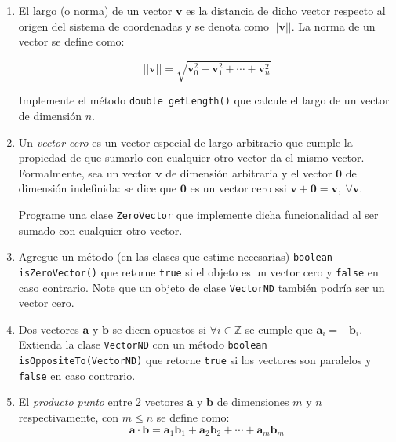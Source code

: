   \begin{Exercise}[title={Algebra vectorial}]
    \begin{enumerate}
      \item El largo (o norma) de un vector \(\mathbf{v}\) es la distancia de dicho vector 
        respecto al origen del sistema de coordenadas y se denota como \(||\mathbf{v}||\).
        La norma de un vector se define como:

        \[  
          ||\mathbf{v}|| = 
            \sqrt{\mathbf{v}_0^2 + \mathbf{v}_1^2 + \cdots + \mathbf{v}_n^2 }
        \]

        Implemente el método \texttt{double getLength()} que calcule el largo de
        un vector de dimensión \(n\). 

      \item Un \textit{vector cero} es un vector especial de largo arbitrario que cumple 
        la propiedad de que sumarlo con cualquier otro vector da el mismo vector.
        Formalmente, sea un vector \(\mathbf{v}\) de dimensión arbitraria y el vector 
        \(\mathbf{0}\) de dimensión indefinida: se dice que \(\mathbf{0}\) es un vector 
        cero ssi \(\mathbf{v} + \mathbf{0} = \mathbf{v},\ \forall \mathbf{v}\).

        Programe una clase \texttt{ZeroVector} que implemente dicha funcionalidad al ser 
        sumado con cualquier otro vector.
      
      \item Agregue un método (en las clases que estime necesarias) 
        \texttt{boolean isZeroVector()} que retorne \texttt{true} si
        el objeto es un vector cero y \texttt{false} en caso contrario.
        Note que un objeto de clase \texttt{VectorND} también podría ser un vector cero.

      \item Dos vectores \(\mathbf{a}\) y \(\mathbf{b}\) se dicen opuestos si 
        \(\forall i \in \mathbb{Z}\) 
        se cumple que \(\mathbf{a}_i = -\mathbf{b}_i\).
        Extienda la clase \texttt{VectorND} con un método 
        \texttt{boolean isOppositeTo(VectorND)} que retorne 
        \texttt{true} si los vectores son paralelos y \texttt{false} 
        en caso contrario.
      
      \item El \textit{producto punto} entre 2 vectores \(\mathbf{a}\) y \(\mathbf{b}\) de 
        dimensiones \(m\) y \(n\) respectivamente, con \(m \leq n\) se define como:
        \[
          \mathbf{a} \cdot \mathbf{b} = \mathbf{a}_1 \mathbf{b}_1 
            + \mathbf{a}_2 \mathbf{b}_2 + \cdots + \mathbf{a}_m \mathbf{b}_m
        \]


\end{enumerate}
\end{Exercise}
